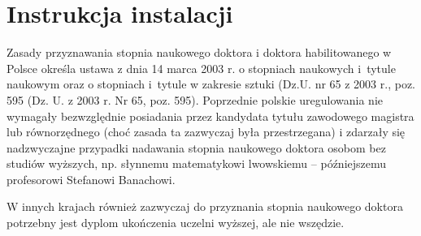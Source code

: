 \chapter{Instrukcja instalacji}
Zasady przyznawania stopnia naukowego doktora i doktora habilitowanego w Polsce określa ustawa z dnia 14 marca 2003 r. o stopniach naukowych i~tytule naukowym oraz o stopniach i~tytule w zakresie sztuki (Dz.U. nr 65 z 2003 r., poz. 595 (Dz. U. z 2003 r. Nr 65, poz. 595). Poprzednie polskie uregulowania nie wymagały bezwzględnie posiadania przez kandydata tytułu zawodowego magistra lub równorzędnego (choć zasada ta zazwyczaj była przestrzegana) i zdarzały się nadzwyczajne przypadki nadawania stopnia naukowego doktora osobom bez studiów wyższych, np. słynnemu matematykowi lwowskiemu – późniejszemu profesorowi Stefanowi Banachowi. 

W innych krajach również zazwyczaj do przyznania stopnia naukowego doktora potrzebny jest dyplom ukończenia uczelni wyższej, ale nie wszędzie.

